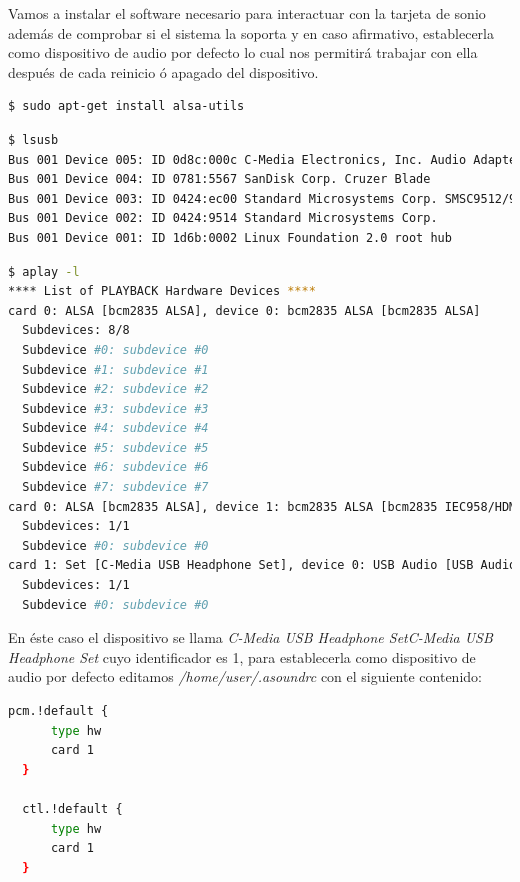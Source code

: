 Vamos a instalar el software necesario para interactuar con la tarjeta de sonio además de comprobar si el sistema la soporta y en caso afirmativo, establecerla como dispositivo de audio por defecto lo cual nos permitirá trabajar con ella después de cada reinicio ó apagado del dispositivo.

\begin{lstlisting}[language=bash,caption={Instalación del paquete alsa-utils},label={lst:pi3}]
$ sudo apt-get install alsa-utils
\end{lstlisting}

\begin{lstlisting}[language=bash,caption={Comprobano que el dispositivo es reconocido},label={lst:pi3}]
$ lsusb
Bus 001 Device 005: ID 0d8c:000c C-Media Electronics, Inc. Audio Adapter
Bus 001 Device 004: ID 0781:5567 SanDisk Corp. Cruzer Blade
Bus 001 Device 003: ID 0424:ec00 Standard Microsystems Corp. SMSC9512/9514 Fast Ethernet Adapter
Bus 001 Device 002: ID 0424:9514 Standard Microsystems Corp.
Bus 001 Device 001: ID 1d6b:0002 Linux Foundation 2.0 root hub
\end{lstlisting}

\begin{lstlisting}[language=bash,caption={Identificando los dispositivos de sonido disponibles en el sistema},label={lst:pi4}]
$ aplay -l
**** List of PLAYBACK Hardware Devices ****
card 0: ALSA [bcm2835 ALSA], device 0: bcm2835 ALSA [bcm2835 ALSA]
  Subdevices: 8/8
  Subdevice #0: subdevice #0
  Subdevice #1: subdevice #1
  Subdevice #2: subdevice #2
  Subdevice #3: subdevice #3
  Subdevice #4: subdevice #4
  Subdevice #5: subdevice #5
  Subdevice #6: subdevice #6
  Subdevice #7: subdevice #7
card 0: ALSA [bcm2835 ALSA], device 1: bcm2835 ALSA [bcm2835 IEC958/HDMI]
  Subdevices: 1/1
  Subdevice #0: subdevice #0
card 1: Set [C-Media USB Headphone Set], device 0: USB Audio [USB Audio]
  Subdevices: 1/1
  Subdevice #0: subdevice #0
	\end{lstlisting}

\bigskip

En éste caso el dispositivo se llama \textit{C-Media USB Headphone SetC-Media USB Headphone Set} cuyo identificador es 1, para establecerla como dispositivo de audio por defecto editamos \textit{/home/user/.asoundrc} con el siguiente contenido:


\begin{lstlisting}[language=bash,caption={Comprobano que el dispositivo es reconocido},label={lst:pi5}]
    pcm.!default {
      type hw
      card 1
  }

  ctl.!default {
      type hw
      card 1
  }
\end{lstlisting}

